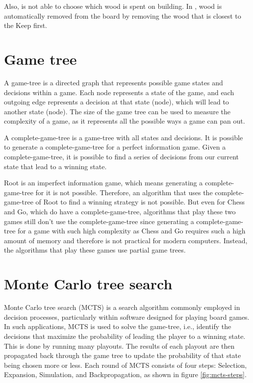 Also, \Marquise{} is not able to choose which wood is spent on building. In \RootV, wood is automatically removed from the board by removing the wood that is closest to the Keep first. 

\section{Game tree}
A \gls{game-tree} is a directed graph that represents possible game states and decisions within a game. Each node represents a state of the game, and each outgoing edge represents a decision at that state (node), which will lead to another state (node). The size of the game tree can be used to measure the complexity of a game, as it represents all the possible ways a game can pan out.

A \gls{complete-game-tree} is a \gls{game-tree} with all states and decisions. It is possible to generate a \gls{complete-game-tree} for a perfect information game. Given a \gls{complete-game-tree}, it is possible to find a series of decisions from our current state that lead to a winning state.

Root is an imperfect information game, which means generating a \gls{complete-game-tree} for it is not possible. Therefore, an algorithm that uses the \gls{complete-game-tree} of Root to find a winning strategy is not possible. But even for Chess and Go, which do have a \gls{complete-game-tree}, algorithms that play these two games still don't use the \gls{complete-game-tree} since generating a \gls{complete-game-tree} for a game with such high complexity as Chess and Go requires such a high amount of memory and therefore is not practical for modern computers. Instead, the algorithms that play these games use partial game trees.


\section{Monte Carlo tree search}
Monte Carlo tree search (MCTS) \cite{Bradberry_Jeff-2015} is a search algorithm commonly employed in decision processes, particularly within software designed for playing board games. In such applications, MCTS is used to solve the \gls{game-tree}, i.e., identify the decisions that maximize the probability of leading the player to a winning state. This is done by running many \glspl{playout}. The results of each \gls{playout} are then propagated back through the game tree to update the probability of that state being chosen more or less. Each round of MCTS consists of four steps: Selection, Expansion, Simulation, and Backpropagation, as shown in figure \ref{fig:mcts-steps}.

